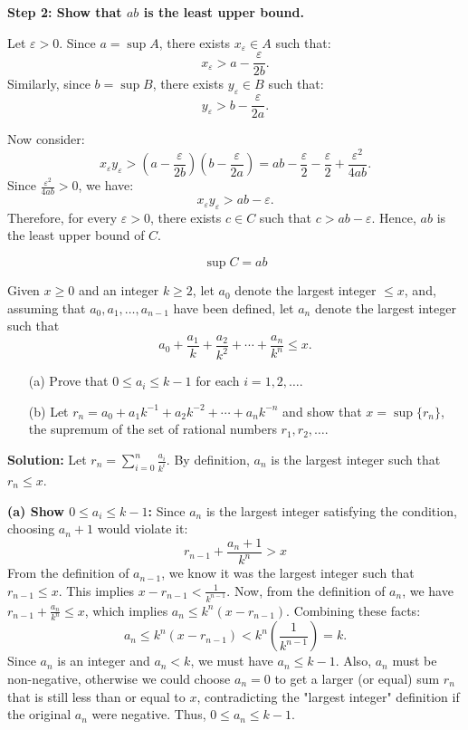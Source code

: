 \textbf{Step 2: Show that \( ab \) is the least upper bound.}

Let \( \varepsilon > 0 \). Since \( a = \sup A \), there exists \( x_\varepsilon \in A \) such that:
\[
x_\varepsilon > a - \frac{\varepsilon}{2b}.
\]
Similarly, since \( b = \sup B \), there exists \( y_\varepsilon \in B \) such that:
\[
y_\varepsilon > b - \frac{\varepsilon}{2a}.
\]

Now consider:
\[
x_\varepsilon y_\varepsilon > \left(a - \frac{\varepsilon}{2b}\right)\left(b - \frac{\varepsilon}{2a}\right) = ab - \frac{\varepsilon}{2} - \frac{\varepsilon}{2} + \frac{\varepsilon^2}{4ab}.
\]
Since \( \frac{\varepsilon^2}{4ab} > 0 \), we have:
\[
x_\varepsilon y_\varepsilon > ab - \varepsilon.
\]
Therefore, for every \( \varepsilon > 0 \), there exists \( c \in C \) such that \( c > ab - \varepsilon \). Hence, \( ab \) is the least upper bound of \( C \).

\[
\boxed{\sup C = ab}
\]

\begin{problembox}
Given \( x \geq 0 \) and an integer \( k \geq 2 \), let \( a_0 \) denote the largest integer \( \leq x \), and, assuming that \( a_0, a_1, \dots, a_{n-1} \) have been defined, let \( a_n \) denote the largest integer such that
\[
a_0 + \frac{a_1}{k} + \frac{a_2}{k^2} + \cdots + \frac{a_n}{k^n} \leq x.
\]

\begin{enumerate}
\item[(a)] Prove that \( 0 \leq a_i \leq k - 1 \) for each \( i = 1, 2, \dots \).
\item[(b)] Let \( r_n = a_0 + a_1 k^{-1} + a_2 k^{-2} + \cdots + a_n k^{-n} \) and show that \( x = \sup \{ r_n \} \), the supremum of the set of rational numbers \( r_1, r_2, \dots \).
\end{enumerate}
\end{problembox}

\textbf{Solution:}
Let \( r_n = \sum_{i=0}^n \frac{a_i}{k^i} \). By definition, \( a_n \) is the largest integer such that \( r_n \leq x \).

\textbf{(a) Show \( 0 \leq a_i \leq k - 1 \):}
Since \( a_n \) is the largest integer satisfying the condition, choosing \( a_n + 1 \) would violate it:
\[
r_{n-1} + \frac{a_n + 1}{k^n} > x
\]
From the definition of \(a_{n-1}\), we know it was the largest integer such that \( r_{n-1} \le x \). This implies $x - r_{n-1} < \frac{1}{k^{n-1}}$.
Now, from the definition of $a_n$, we have $r_{n-1} + \frac{a_n}{k^n} \leq x$, which implies $a_n \leq k^n(x - r_{n-1})$.
Combining these facts:
\[
a_n \leq k^n(x - r_{n-1}) < k^n\left(\frac{1}{k^{n-1}}\right) = k.
\]
Since $a_n$ is an integer and $a_n < k$, we must have $a_n \leq k-1$. Also, $a_n$ must be non-negative, otherwise we could choose $a_n=0$ to get a larger (or equal) sum $r_n$ that is still less than or equal to $x$, contradicting the "largest integer" definition if the original $a_n$ were negative. Thus, $0 \leq a_n \leq k-1$.

